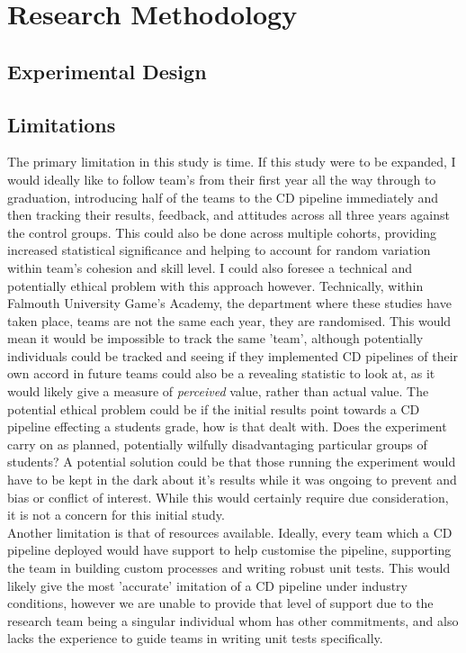 \documentclass[lettersize,journal]{IEEEtran}
\begin{document}
\section{Research Methodology}
    \subsection{Experimental Design}
        

    \subsection{Limitations}
        The primary limitation in this study is time. If this study were to be expanded, I would ideally like to follow team's from their first year all the way through to graduation, introducing half of the teams to the CD pipeline immediately and then tracking their results, feedback, and attitudes across all three years against the control groups. This could also be done across multiple cohorts, providing increased statistical significance and helping to account for random variation within team's cohesion and skill level. I could also foresee a technical and potentially ethical problem with this approach however. Technically, within Falmouth University Game's Academy, the department where these studies have taken place, teams are not the same each year, they are randomised. This would mean it would be impossible to track the same 'team', although potentially individuals could be tracked and seeing if they implemented CD pipelines of their own accord in future teams could also be a revealing statistic to look at, as it would likely give a measure of \textit{perceived} value, rather than actual value.
        The potential ethical problem could be if the initial results point towards a CD pipeline effecting a students grade, how is that dealt with. Does the experiment carry on as planned, potentially wilfully disadvantaging particular groups of students? A potential solution could be that those running the experiment would have to be kept in the dark about it's results while it was ongoing to prevent and bias or conflict of interest. While this would certainly require due consideration, it is not a concern for this initial study. \\

        Another limitation is that of resources available. Ideally, every team which a CD pipeline deployed would have support to help customise the pipeline, supporting the team in building custom processes and writing robust unit tests. This would likely give the most 'accurate' imitation of a CD pipeline under industry conditions, however we are unable to provide that level of support due to the research team being a singular individual whom has other commitments, and also lacks the experience to guide teams in writing unit tests specifically.
    
\end{document}
